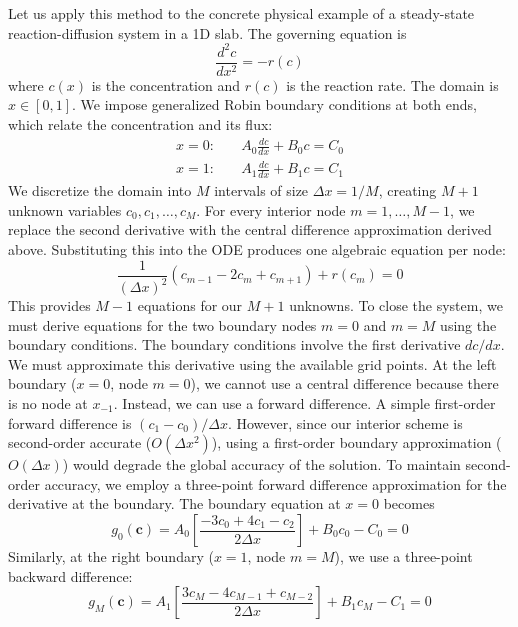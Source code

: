 Let us apply this method to the concrete physical example of a steady-state reaction-diffusion system in a 1D slab. The governing equation is
\begin{equation}
    \frac{d^2 c}{dx^2} = -r(c)
\end{equation}
where $c(x)$ is the concentration and $r(c)$ is the reaction rate. The domain is $x \in [0, 1]$. We impose generalized Robin boundary conditions at both ends, which relate the concentration and its flux:
\begin{align}
    x=0: & \quad A_0 \frac{dc}{dx} + B_0 c = C_0 \\
    x=1: & \quad A_1 \frac{dc}{dx} + B_1 c = C_1
\end{align}
We discretize the domain into $M$ intervals of size $\Delta x = 1/M$, creating $M+1$ unknown variables $c_0, c_1, \dots, c_M$. For every interior node $m = 1, \dots, M-1$, we replace the second derivative with the central difference approximation derived above. Substituting this into the ODE produces one algebraic equation per node:
\begin{equation}
    \frac{1}{(\Delta x)^2} (c_{m-1} - 2c_m + c_{m+1}) + r(c_m) = 0
\end{equation}
This provides $M-1$ equations for our $M+1$ unknowns. To close the system, we must derive equations for the two boundary nodes $m=0$ and $m=M$ using the boundary conditions. The boundary conditions involve the first derivative $dc/dx$. We must approximate this derivative using the available grid points. At the left boundary ($x=0$, node $m=0$), we cannot use a central difference because there is no node at $x_{-1}$. Instead, we can use a forward difference. A simple first-order forward difference is $(c_1 - c_0)/\Delta x$. However, since our interior scheme is second-order accurate ($O(\Delta x^2)$), using a first-order boundary approximation ($O(\Delta x)$) would degrade the global accuracy of the solution. To maintain second-order accuracy, we employ a three-point forward difference approximation for the derivative at the boundary. The boundary equation at $x=0$ becomes
\begin{equation}
    g_0(\mathbf{c}) = A_0 \left[ \frac{-3c_0 + 4c_1 - c_2}{2\Delta x} \right] + B_0 c_0 - C_0 = 0
\end{equation}
Similarly, at the right boundary ($x=1$, node $m=M$), we use a three-point backward difference:
\begin{equation}
    g_M(\mathbf{c}) = A_1 \left[ \frac{3c_M - 4c_{M-1} + c_{M-2}}{2\Delta x} \right] + B_1 c_M - C_1 = 0
\end{equation}
